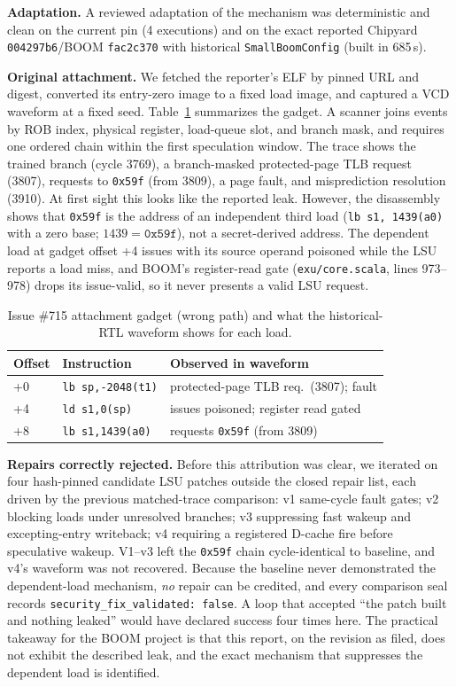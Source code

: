 \documentclass[conference,10pt]{IEEEtran}
\begin{document}
\textbf{Adaptation.} A reviewed adaptation of the mechanism was deterministic and
clean on the current pin (4 executions) and on the exact reported
Chipyard \texttt{004297b6}/BOOM \texttt{fac2c370} with historical
\texttt{SmallBoomConfig} (built in 685\,s).

\textbf{Original attachment.} We fetched the reporter's ELF by pinned URL and
digest, converted its entry-zero image to a fixed load image, and captured a
VCD waveform at a fixed seed. Table~\ref{tab:gadget} summarizes the gadget. A scanner joins events by ROB index,
physical register, load-queue slot, and branch mask, and requires one ordered
chain within the first speculation window. The trace shows the trained branch
(cycle 3769), a branch-masked protected-page TLB request (3807), requests to
\texttt{0x59f} (from 3809), a page fault, and misprediction resolution (3910).
At first sight this looks like the reported leak. However, the disassembly shows that
\texttt{0x59f} is the address of an independent third load
(\texttt{lb s1, 1439(a0)} with a zero base; $1439 = \texttt{0x59f}$), not a
secret-derived address. The dependent load at gadget offset +4 issues with its source operand
poisoned while the LSU reports a load miss, and BOOM's register-read gate
(\texttt{exu/core.scala}, lines 973--978) drops its issue-valid, so it never
presents a valid LSU request.

\begin{table}[t]
\centering
\caption{Issue \#715 attachment gadget (wrong path) and what the
historical-RTL waveform shows for each load.}
\label{tab:gadget}
\footnotesize
\setlength{\tabcolsep}{3pt}
\begin{tabular}{@{}lll@{}}
\toprule
Offset & Instruction & Observed in waveform \\
\midrule
+0 & \texttt{lb sp,-2048(t1)} & protected-page TLB req.\ (3807); fault \\
+4 & \texttt{ld s1,0(sp)} & issues poisoned; register read gated \\
+8 & \texttt{lb s1,1439(a0)} & requests \texttt{0x59f} (from 3809) \\
\bottomrule
\end{tabular}
\end{table}

\textbf{Repairs correctly rejected.} Before this attribution was clear, we
iterated on four hash-pinned candidate LSU patches outside the closed repair
list, each driven by the previous matched-trace comparison: v1 same-cycle fault
gates; v2 blocking loads under unresolved branches; v3 suppressing fast wakeup and
excepting-entry writeback; v4 requiring a registered D-cache fire before
speculative wakeup. V1--v3 left the \texttt{0x59f} chain cycle-identical to
baseline, and v4's waveform was not recovered. Because the baseline never
demonstrated the dependent-load mechanism, \emph{no} repair can be credited, and
every comparison seal records \texttt{security\_fix\_validated: false}. A loop
that accepted ``the patch built and nothing leaked'' would have declared success
four times here. The practical takeaway for the BOOM project is that this report,
on the revision as filed, does not exhibit the described leak, and the exact
mechanism that suppresses the dependent load is identified.
\end{document}
